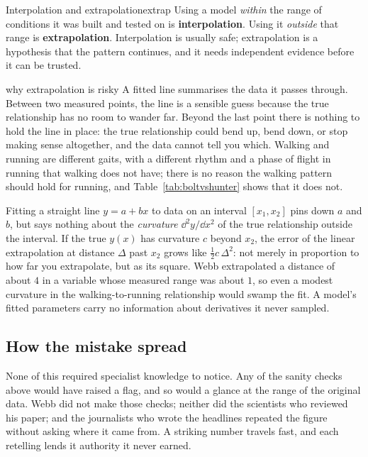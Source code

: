 \begin{definition}{Interpolation and extrapolation}{extrap}
Using a model \emph{within} the range of conditions it was built and tested on is \textbf{interpolation}. Using it \emph{outside} that range is \textbf{extrapolation}. Interpolation is usually safe; extrapolation is a hypothesis that the pattern continues, and it needs independent evidence before it can be trusted.
\end{definition}

\begin{twoviews}{why extrapolation is risky}
\elem A fitted line summarises the data it passes through. Between two measured points, the line is a sensible guess because the true relationship has no room to wander far. Beyond the last point there is nothing to hold the line in place: the true relationship could bend up, bend down, or stop making sense altogether, and the data cannot tell you which. Walking and running are different gaits, with a different rhythm and a phase of flight in running that walking does not have; there is no reason the walking pattern should hold for running, and Table~\ref{tab:boltvshunter} shows that it does not.

\calc Fitting a straight line $y = a + bx$ to data on an interval $[x_1, x_2]$ pins down $a$ and $b$, but says nothing about the \emph{curvature} $\dd^2 y/\dd x^2$ of the true relationship outside the interval. If the true $y(x)$ has curvature $c$ beyond $x_2$, the error of the linear extrapolation at distance $\Delta$ past $x_2$ grows like $\tfrac12 c\,\Delta^2$: not merely in proportion to how far you extrapolate, but as its square. Webb extrapolated a distance of about $4$ in a variable whose measured range was about $1$, so even a modest curvature in the walking-to-running relationship would swamp the fit. A model's fitted parameters carry no information about derivatives it never sampled.
\end{twoviews}

\subsection{How the mistake spread}

None of this required specialist knowledge to notice. Any of the sanity checks above would have raised a flag, and so would a glance at the range of the original data. Webb did not make those checks; neither did the scientists who reviewed his paper; and the journalists who wrote the headlines repeated the figure without asking where it came from. A striking number travels fast, and each retelling lends it authority it never earned.


